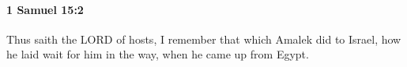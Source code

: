 
		\paragraph{1 Samuel 15:2} %
			\label{1SAMUEL-15-2}

			Thus saith the LORD of hosts, I remember that which Amalek did to Israel, how he laid wait for him in the way, when he came up from Egypt.



